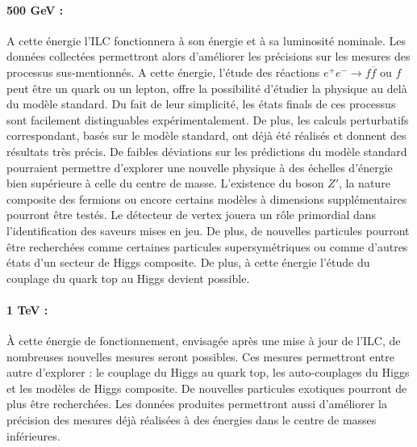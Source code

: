    \paragraph{500 GeV :} A cette \'energie l'ILC fonctionnera \`a son \'energie et \`a sa luminosit\'e nominale. Les donn\'ees collect\'ees permettront alors d'am\'eliorer les pr\'ecisions sur les mesures des processus sus-mentionn\'es. A cette \'energie, l'\'etude des r\'eactions $e^+ e^- \rightarrow f \overline{f}$ ou $f$ peut \^etre un quark ou un lepton, offre la possibilit\'e d'\'etudier la physique au delà du mod\`ele standard. Du fait de leur simplicit\'e, les \'etats finals de ces processus sont facilement distinguables exp\'erimentalement. De plus, les calculs perturbatifs correspondant, bas\'es sur le mod\`ele standard, ont d\'ejà \'et\'e r\'ealisés et donnent des r\'esultats tr\`es pr\'ecis. De faibles d\'eviations sur les pr\'edictions du mod\`ele standard pourraient permettre d'explorer une nouvelle physique \`a des \'echelles d'\'energie bien sup\'erieure \`a celle du centre de masse. L'existence du boson $Z'$, la nature composite des fermions ou encore certains mod\`eles \`a dimensions suppl\'ementaires pourront \^etre test\'es. Le d\'etecteur de vertex jouera un r\^ole primordial dans l'identification des saveurs mises en jeu. De plus, de nouvelles particules pourront \^etre recherch\'ees comme certaines particules supersym\'etriques ou comme d'autres \'etats d'un secteur de Higgs composite. De plus, \`a cette \'energie l'\'etude du couplage du quark top au Higgs devient possible.
   
   \paragraph{1 TeV :} \`A cette \'energie de fonctionnement, envisag\'ee apr\`es une mise \`a jour de l'ILC, de nombreuses nouvelles mesures seront possibles. Ces mesures permettront entre autre d'explorer : le couplage du Higgs au quark top, les auto-couplages du Higgs et les mod\`eles de Higgs composite. De nouvelles particules exotiques pourront de plus \^etre recherch\'ees. Les donn\'ees produites permettront aussi d'am\'eliorer la pr\'ecision des mesures d\'ej\`a r\'ealis\'ees \`a des \'energies dans le centre de masses inf\'erieures.
   


